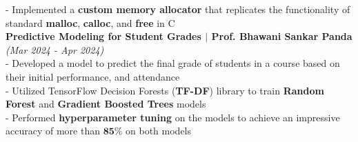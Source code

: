 \documentclass[a4paper,10pt]{article}
\begin{document}
- Implemented a \textbf{custom memory allocator} that replicates the functionality of standard \textbf{malloc}, \textbf{calloc}, and \textbf{free} in C\\
\textbf{Predictive Modeling for Student Grades $\mid$ Prof. Bhawani Sankar Panda} \hfill\textit{(Mar 2024 - Apr 2024)} \href{https://github.com/khushvind/MTL782-Data-Mining/tree/main/A1}{\raisebox{-0.05\height}\faGithub}\\
- Developed a model to predict the final grade of students in a course based on their initial performance, and attendance\\
- Utilized TensorFlow Decision Forests (\textbf{TF-DF}) library to train \textbf{Random Forest} and \textbf{Gradient Boosted Trees} models\\
- Performed\textbf{ hyperparameter tuning} on the models to achieve an impressive accuracy of more than $\textbf{85\%}$ on both models\\
\end{document}
